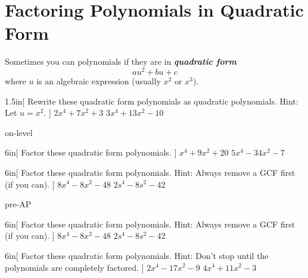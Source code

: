 
\section{Factoring Polynomials in Quadratic Form}

\begin{myCenteredBox}[width=4.75in,]
    Sometimes you can  polynomials if they are in 
    {\bfseries\itshape quadratic form}
    {\Large
    \begin{equation*}
        au^2 + bu + c
    \end{equation*}
    }
    where $u$ is an algebraic expression (usually $x^2$ or $x^3$).
\end{myCenteredBox}

\begin{my2Problems}[\large]{1.5in}[
    Rewrite these quadratic form polynomials as quadratic polynomials.
    Hint: Let $u=x^2$.
    ]
    {
        $ 2x^4 + 7x^2 + 3 $
    }
    {
        $ 3x^4 + 13x^2 - 10 $
    }
\end{my2Problems}


\begin{taggedblock}{on-level}
    \begin{my2Problems}[\large]{6in}[
        Factor these quadratic form polynomials.
        ]
        {
            $ x^4 + 9x^2 + 20 $
        }
        {
            $ 5x^4 - 34x^2 - 7 $
        }
    \end{my2Problems}

    \begin{my2Problems}[\large]{6in}[
        Factor these quadratic form polynomials. 
        Hint: Always remove a GCF first (if you can).
        ]
        {
            $ 8x^4 - 8x^2 - 48 $
        }
        {
            $ 2s^4 - 8s^2 - 42 $
        }
    \end{my2Problems}
\end{taggedblock}


\begin{taggedblock}{pre-AP}
    \begin{my2Problems}[\large]{6in}[
        Factor these quadratic form polynomials. 
        Hint: Always remove a GCF first (if you can).
        ]
        {
            $ 8x^4 - 8x^2 - 48 $
        }
        {
            $ 2s^4 - 8s^2 - 42 $
        }
    \end{my2Problems}

    \begin{my2Problems}[\large]{6in}[
        Factor these quadratic form polynomials. 
        Hint: Don't stop until the polynomials are completely factored.
        ]
        {
            $ 2x^4 - 17x^2 - 9 $
        }
        {
            $ 4x^4 + 11x^2 - 3 $
        }
    \end{my2Problems}
\end{taggedblock}
